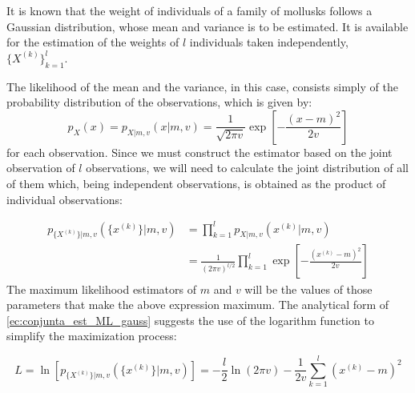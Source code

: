 \begin{example}
\label{ex:gauss_ML}

It is known that the weight of individuals of a family of mollusks follows a Gaussian distribution, whose mean and variance is to be estimated. It is available for the estimation of the weights of $l$ individuals taken independently, $\{X^{(k)}\}_{k=1}^l$.

 The likelihood of the mean and the variance, in this case, consists simply of the probability distribution of the observations, which is given by:
\begin{equation}
p_{X}(x) = p_{X|m,v}(x|m,v) = \frac{1}{\sqrt{2\pi v}} \exp\left[-\frac{(x-m)^2}{2 v}\right]
\end{equation}
for each observation. Since we must construct the estimator based on the joint observation of $l$ observations, we will need to calculate the joint distribution of all of them which, being independent observations, is obtained as the product of individual observations:

\begin{equation}
\label{ec:conjunta_est_ML_gauss}
\begin{split}
p_{\{X^{(k)}\}|m,v}(\{x^{(k)}\}|m,v) & = \prod_{k=1}^l p_{X|m,v}(x^{(k)}|m,v) \\ &= \frac{1}{(2\pi v)^{l/2}} \prod_{k=1}^l \exp\left[-\frac{(x^{(k)}-m)^2}{2 v}\right]
\end{split}
\end{equation}
The maximum likelihood estimators of $m$ and $v$ will be the values of those parameters that make the above expression maximum. The analytical form of \eqref{ec:conjunta_est_ML_gauss} suggests the use of the logarithm function to simplify the maximization process:

\begin{equation}
\label{ec:conjunta_est_ML_gauss_log}
L = \ln \left[ p_{\{X^{(k)}\}|m,v}(\{x^{(k)}\}|m,v) \right] = -\frac{l}{2} \ln(2\pi v) - \frac{1}{2v} \sum_{k=1}^l (x^{(k)}-m)^2
\end{equation}


\end{example}
